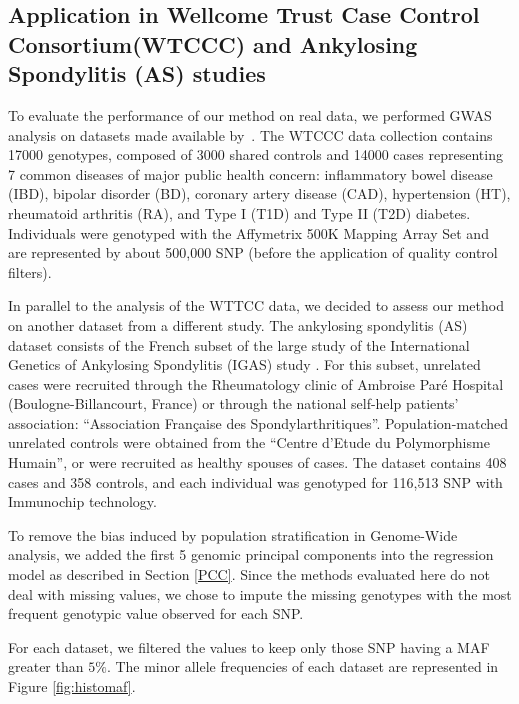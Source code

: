 \documentclass[]{book}
\begin{document}
\hypertarget{leosappli}{%
\subsection{Application in Wellcome Trust Case Control Consortium(WTCCC) and Ankylosing Spondylitis (AS) studies}\label{leosappli}}

To evaluate the performance of our method on real data, we performed
GWAS analysis on datasets made available by~\citep{burton_genome-wide_2007}.
The WTCCC data collection contains 17000 genotypes, composed of 3000
shared controls and 14000 cases representing 7 common diseases of major
public health concern: inflammatory bowel disease (IBD), bipolar
disorder (BD), coronary artery disease (CAD), hypertension (HT),
rheumatoid arthritis (RA), and Type I (T1D) and Type II (T2D) diabetes.
Individuals were genotyped with the Affymetrix 500K Mapping Array Set
and are represented by about 500,000 SNP (before the application of
quality control filters).

In parallel to the analysis of the WTTCC data, we decided to assess our
method on another dataset from a different study. The ankylosing
spondylitis (AS) dataset consists of the French subset of the large
study of the International Genetics of Ankylosing Spondylitis (IGAS)
study \citep{IGAS_2013_identification}. For this subset, unrelated cases were
recruited through the Rheumatology clinic of Ambroise Paré Hospital
(Boulogne-Billancourt, France) or through the national self-help
patients' association: ``Association Française des Spondylarthritiques''.
Population-matched unrelated controls were obtained from the ``Centre
d'Etude du Polymorphisme Humain'', or were recruited as healthy spouses
of cases. The dataset contains 408 cases and 358 controls, and each
individual was genotyped for 116,513 SNP with Immunochip technology.

To remove the bias induced by population stratification in Genome-Wide
analysis, we added the first 5 genomic principal components into the
regression model as described in Section \ref{PCC}. Since the methods
evaluated here do not deal with missing values, we chose to impute the
missing genotypes with the most frequent genotypic value observed for
each SNP.

For each dataset, we filtered the values to keep only those SNP having a
MAF greater than \(5\%\). The minor allele frequencies of each dataset are
represented in Figure \ref{fig:histomaf}.
\end{document}
